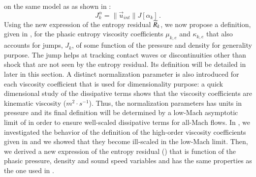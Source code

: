 \documentclass[preprint,10pt]{elsarticle}
\begin{document}
on the same model as  as shown in :
\begin{equation}\label{eq:jump-alpha}
J_k^\alpha = \| \vec{u}_{int} \| J[\alpha_k] \,.
\end{equation}
Using the new expression of the entropy residual $\widetilde{R}_k$, we now propose a definition, given in , for the phasic entropy 
viscosity coefficients $\mu_{k,e}$ and $\kappa_{k,e}$ that also accounts for jumps, $J_k$, of some function of the pressure and density for generality purpose. 
The jump helps at tracking contact waves or discontinuities other than shock that are not seen by the entropy residual. Its definition will be detailed in later in 
this section. A distinct normalization parameter is also introduced for each viscosity coefficient that is used for dimensionality purpose: a quick dimensional 
study of the dissipative terms shows that the viscosity coefficients are kinematic viscosity ($m^2 \cdot s^{-1}$). Thus, the normalization parameters has units in 
pressure and its final definition will be determined by a low-Mach asymptotic limit of  in order to ensure well-scaled dissipative terms for all-Mach 
flows.
In \cite{Marco_paper_low_mach}, we investigated the behavior of the definition of the high-order viscosity coefficients given in \cite{jlg1, jlg2, jlg3} and we 
showed that they become ill-scaled in the low-Mach limit. Then, we derived a new expression of the entropy residual () that is function of 
the phasic pressure, density and sound speed variables and has the same properties as the one used in \cite{jlg1, jlg2, jlg3}. 
%
\end{document}
